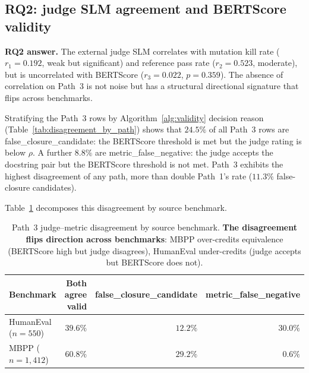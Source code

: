 \subsection{RQ2: judge SLM agreement and BERTScore validity}

\textbf{RQ2 answer.} The external judge SLM correlates with mutation kill rate ($r_1 = 0.192$, weak but significant) and reference pass rate ($r_2 = 0.523$, moderate), but is uncorrelated with BERTScore ($r_3 = 0.022$, $p = 0.359$). The absence of correlation on Path~3 is not noise but has a structural directional signature that flips across benchmarks.



Stratifying the Path~3 rows by Algorithm~\ref{alg:validity} decision reason (Table~\ref{tab:disagreement_by_path}) shows that $24.5\%$ of all Path~3 rows are \textsf{false\_closure\_candidate}: the BERTScore threshold is met but the judge rating is below $\rho$. A further $8.8\%$ are \textsf{metric\_false\_negative}: the judge accepts the docstring pair but the BERTScore threshold is not met. Path~3 exhibits the highest disagreement of any path, more than double Path~1's rate ($11.3\%$ false-closure candidates).

Table~\ref{tab:disagreement_p3_by_benchmark} decomposes this disagreement by source benchmark.

\begin{table}[htbp]
\centering
\small
\caption{Path~3 judge--metric disagreement by source benchmark. \textbf{The disagreement flips direction across benchmarks}: MBPP over-credits equivalence (BERTScore high but judge disagrees), HumanEval under-credits (judge accepts but BERTScore does not).}
\label{tab:disagreement_p3_by_benchmark}
\begin{tabular}{lrrr}
\toprule
Benchmark & Both agree valid & \textsf{false\_closure\_candidate} & \textsf{metric\_false\_negative} \\
\midrule
HumanEval ($n = 550$) & $39.6\%$ & $12.2\%$ & $\mathbf{30.0\%}$ \\
MBPP ($n = 1{,}412$) & $60.8\%$ & $\mathbf{29.2\%}$ & $0.6\%$ \\
\bottomrule
\end{tabular}
\end{table}

